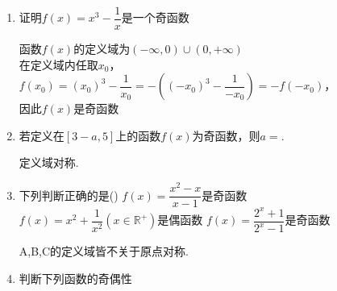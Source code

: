 \begin{enumerate}
    \item 证明$f(x) = x^3 - \dfrac{1}{x}$是一个奇函数
    \begin{jieda}
        函数$f(x)$的定义域为$(-\infty, 0) \cup (0, +\infty)$ \\
        在定义域内任取$x_0$，$f(x_0) = (x_0)^3 - \dfrac{1}{x_0} = -((-x_0)^3 - \dfrac{1}{-x_0})  = -f(-x_0)$，\\
        因此$f(x)$是奇函数
    \end{jieda}
    \item 若定义在$[3-a,5]$上的函数$f(x)$为奇函数，则$a=$. 
    \begin{jieda}
    定义域对称.
    \end{jieda}
    \item 下列判断正确的是\dotfill()
    {$f(x)=\dfrac{x^2-x}{x-1}$是奇函数}
    {$f(x)=x^2+\dfrac{1}{x^2}(x\in\mathbb{R}^+)是偶函数$}
    {$f(x)=\dfrac{2^x+1}{2^x-1}$是奇函数}
    \begin{jieda}
    A,B,C的定义域皆不关于原点对称. 
    \end{jieda}
    
    \item 判断下列函数的奇偶性
    \begin{jieda}
    \end{jieda}
    

\end{enumerate}
